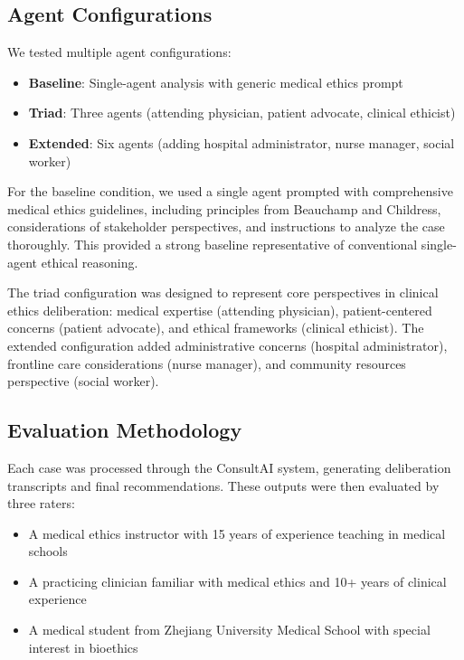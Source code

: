 \documentclass[11pt]{article}
\begin{document}
\subsection{Agent Configurations}

We tested multiple agent configurations:
\begin{itemize}
    \item \textbf{Baseline}: Single-agent analysis with generic medical ethics prompt
    \item \textbf{Triad}: Three agents (attending physician, patient advocate, clinical ethicist)
    \item \textbf{Extended}: Six agents (adding hospital administrator, nurse manager, social worker)
\end{itemize}

For the baseline condition, we used a single agent prompted with comprehensive medical ethics guidelines, including principles from Beauchamp and Childress, considerations of stakeholder perspectives, and instructions to analyze the case thoroughly. This provided a strong baseline representative of conventional single-agent ethical reasoning.

The triad configuration was designed to represent core perspectives in clinical ethics deliberation: medical expertise (attending physician), patient-centered concerns (patient advocate), and ethical frameworks (clinical ethicist). The extended configuration added administrative concerns (hospital administrator), frontline care considerations (nurse manager), and community resources perspective (social worker).

\subsection{Evaluation Methodology}

Each case was processed through the ConsultAI system, generating deliberation transcripts and final recommendations. These outputs were then evaluated by three raters:
\begin{itemize}
    \item A medical ethics instructor with 15 years of experience teaching in medical schools
    \item A practicing clinician familiar with medical ethics and 10+ years of clinical experience
    \item A medical student from Zhejiang University Medical School with special interest in bioethics
\end{itemize}
\end{document}
